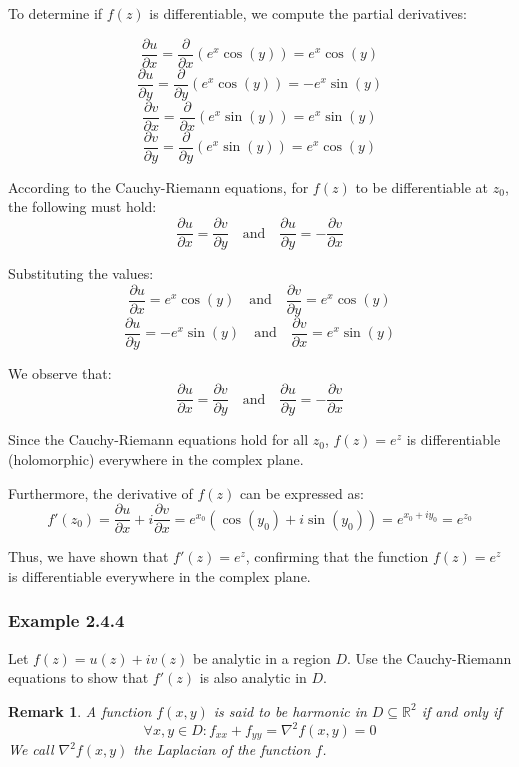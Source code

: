 \documentclass[12pt]{book}
\newcommand{\R}{\mathbb{R}}
\newcommand{\pypx}[2]{\frac{\partial #1}{\partial #2}}
\newtheorem*{remark}{Remark}
\begin{document}
To determine if \( f(z) \) is differentiable, we compute the partial derivatives:

\[
\pypx{u}{x} = \pypx{}{x} \left( e^x \cos(y) \right) = e^x \cos(y)
\]
\[
\pypx{u}{y} = \pypx{}{y} \left( e^x \cos(y) \right) = -e^x \sin(y)
\]
\[
\pypx{v}{x} = \pypx{}{x} \left( e^x \sin(y) \right) = e^x \sin(y)
\]
\[
\pypx{v}{y} = \pypx{}{y} \left( e^x \sin(y) \right) = e^x \cos(y)
\]

According to the Cauchy-Riemann equations, for \( f(z) \) to be differentiable at \( z_0 \), the following must hold:
\[
\pypx{u}{x} = \pypx{v}{y} \quad \text{and} \quad \pypx{u}{y} = -\pypx{v}{x}
\]

Substituting the values:
\[
\pypx{u}{x} = e^x \cos(y) \quad \text{and} \quad \pypx{v}{y} = e^x \cos(y)
\]
\[
\pypx{u}{y} = -e^x \sin(y) \quad \text{and} \quad \pypx{v}{x} = e^x \sin(y)
\]

We observe that:
\[
\pypx{u}{x} = \pypx{v}{y} \quad \text{and} \quad \pypx{u}{y} = -\pypx{v}{x}
\]

Since the Cauchy-Riemann equations hold for all \( z_0 \), \( f(z) = e^z \) is differentiable (holomorphic) everywhere in the complex plane.

Furthermore, the derivative of \( f(z) \) can be expressed as:
\[
f'(z_0) = \pypx{u}{x} + i \pypx{v}{x} = e^{x_0} \left( \cos(y_0) + i \sin(y_0) \right) = e^{x_0 + iy_0} = e^{z_0}
\]

Thus, we have shown that \( f'(z) = e^z \), confirming that the function \( f(z) = e^z \) is differentiable everywhere in the complex plane.

\subsubsection{Example 2.4.4}
Let $f(z) = u(z) + iv(z)$ be analytic in a region $D$.  Use the Cauchy-Riemann equations to show that $f'(z)$ is also analytic in $D$. 

\begin{remark}
    A function $f(x,y)$ is said to be harmonic in $D \subseteq \R^2$ if and only if
    \[
    \forall x,y \in D \colon f_{xx} + f_{yy} = \nabla^2f(x,y) = 0
    \]
    We call $\nabla^2f(x,y)$ the Laplacian of the function $f$. 
\end{remark}
\end{document}
